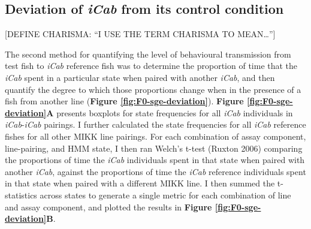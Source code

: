 \documentclass[
]{book}
\begin{document}
\hypertarget{deviation-of-from-its-control-condition}{%
\subsection{\texorpdfstring{Deviation of \emph{\textcolor{iCab_424B4D}{iCab}} from its control condition}{Deviation of  from its control condition}}\label{deviation-of-from-its-control-condition}}

{[}DEFINE CHARISMA: ``I USE THE TERM CHARISMA TO MEAN\ldots{}''{]}

The second method for quantifying the level of behavioural transmission from test fish to \emph{\textcolor{iCab_424B4D}{iCab}} reference fish was to determine the proportion of time that the \emph{\textcolor{iCab_424B4D}{iCab}} spent in a particular state when paired with another \emph{\textcolor{iCab_424B4D}{iCab}}, and then quantify the degree to which those proportions change when in the presence of a fish from another line (\textbf{Figure \ref{fig:F0-sge-deviation}}). \textbf{Figure \ref{fig:F0-sge-deviation}A} presents boxplots for state frequencies for all \emph{\textcolor{iCab_424B4D}{iCab}} individuals in \emph{\textcolor{iCab_424B4D}{iCab}}-\emph{\textcolor{iCab_424B4D}{iCab}} pairings. I further calculated the state frequencies for all \emph{\textcolor{iCab_424B4D}{iCab}} reference fishes for all other MIKK line pairings. For each combination of assay component, line-pairing, and HMM state, I then ran Welch's t-test (Ruxton 2006) comparing the proportions of time the \emph{\textcolor{iCab_424B4D}{iCab}} individuals spent in that state when paired with another \emph{\textcolor{iCab_424B4D}{iCab}}, against the proportions of time the \emph{\textcolor{iCab_424B4D}{iCab}} reference individuals spent in that state when paired with a different MIKK line. I then summed the t-statistics across states to generate a single metric for each combination of line and assay component, and plotted the results in \textbf{Figure \ref{fig:F0-sge-deviation}B}.
\end{document}
